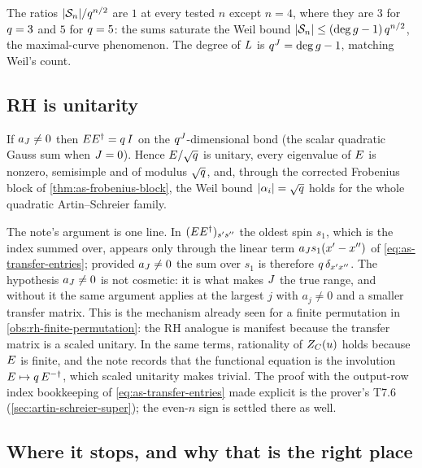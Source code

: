 The ratios $|\mathcal S_{n}|/q^{n/2}$ are $1$ at every tested $n$ except
$n = 4$, where they are $3$ for $q=3$ and $5$ for $q=5$: the sums
saturate the Weil bound $|\mathcal S_{n}| \le (\deg g - 1)\,q^{n/2}$, the
maximal-curve phenomenon. The degree of $L$ is $q^{J} = \deg
g - 1$, matching Weil's count.

\subsection{RH is unitarity}

\begin{proposition}
\label{prop:as-unitarity}
If $a_{J}\ne 0$ then $EE^{\dagger} = q\,I$ on the
$q^{J}$-dimensional bond (the scalar quadratic Gauss sum when $J = 0$).
Hence $E/\sqrt{q}$ is unitary, every eigenvalue of $E$ is nonzero, semisimple
and of modulus $\sqrt{q}$, and, through the corrected Frobenius block of
\cref{thm:as-frobenius-block}, the Weil bound $|\alpha_{i}| = \sqrt{q}$ holds for the
whole quadratic Artin--Schreier family.
\end{proposition}

The note's argument is one line. In $(EE^{\dagger})_{s's''}$ the
oldest spin $s_1$, which is the index summed over, appears only through the
linear term $a_{J}s_1(x'-x'')$ of \eqref{eq:as-transfer-entries};
provided $a_{J}\ne 0$ the sum over $s_1$ is therefore
$q\,\delta_{x'x''}$. The hypothesis $a_{J}\ne 0$ is not cosmetic: it
is what makes $J$ the true range, and without it the same argument
applies at the largest $j$ with $a_j\ne 0$ and a smaller transfer matrix. This
is the mechanism already seen for a finite permutation in
\cref{obs:rh-finite-permutation}: the RH analogue is manifest because the
transfer matrix is a scaled unitary. In the same terms, rationality of
$Z_C(u)$ holds because $E$ is finite, and the note records that
the functional equation is the involution $E\mapsto q\,E^{-\dagger}$,
which scaled unitarity makes trivial. The proof with the output-row index bookkeeping of
\eqref{eq:as-transfer-entries} made explicit is the prover's T7.6
(\cref{sec:artin-schreier-super}); the even-$n$ sign is settled there as well.

\subsection{Where it stops, and why that is the right place}

